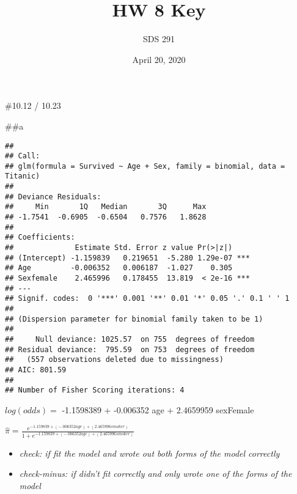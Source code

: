 \documentclass[]{article}
\title{HW 8 Key}
\author{SDS 291}
\date{April 20, 2020}
\newenvironment{Shaded}{\begin{snugshade}}{\end{snugshade}}
\newcommand{\DataTypeTok}[1]{\textcolor[rgb]{0.13,0.29,0.53}{#1}}
\newcommand{\KeywordTok}[1]{\textcolor[rgb]{0.13,0.29,0.53}{\textbf{#1}}}
\newcommand{\NormalTok}[1]{#1}
\newcommand{\OperatorTok}[1]{\textcolor[rgb]{0.81,0.36,0.00}{\textbf{#1}}}
\newcommand{\StringTok}[1]{\textcolor[rgb]{0.31,0.60,0.02}{#1}}
\providecommand{\tightlist}{%
  \setlength{\itemsep}{0pt}\setlength{\parskip}{0pt}}
\begin{document}
\maketitle

\#10.12 / 10.23

\#\#a

\begin{Shaded}
\end{Shaded}

\begin{verbatim}
## 
## Call:
## glm(formula = Survived ~ Age + Sex, family = binomial, data = Titanic)
## 
## Deviance Residuals: 
##     Min       1Q   Median       3Q      Max  
## -1.7541  -0.6905  -0.6504   0.7576   1.8628  
## 
## Coefficients:
##              Estimate Std. Error z value Pr(>|z|)    
## (Intercept) -1.159839   0.219651  -5.280 1.29e-07 ***
## Age         -0.006352   0.006187  -1.027    0.305    
## Sexfemale    2.465996   0.178455  13.819  < 2e-16 ***
## ---
## Signif. codes:  0 '***' 0.001 '**' 0.01 '*' 0.05 '.' 0.1 ' ' 1
## 
## (Dispersion parameter for binomial family taken to be 1)
## 
##     Null deviance: 1025.57  on 755  degrees of freedom
## Residual deviance:  795.59  on 753  degrees of freedom
##   (557 observations deleted due to missingness)
## AIC: 801.59
## 
## Number of Fisher Scoring iterations: 4
\end{verbatim}

\(log(odds) =\) -1.1598389 + -0.006352 age + 2.4659959 sexFemale

\(\hat\pi = \frac{e^{-1.159839+(-.006352age)+(2.465996smoker)}}{1+e^{-1.159839+(-.006352age)+(2.465996smoker)}}\)

\begin{itemize}
\tightlist
\item
  \emph{check: if fit the model and wrote out both forms of the model
  correctly}
\item
  \emph{check-minus: if didn't fit correctly and only wrote one of the
  forms of the model}
\end{itemize}
\end{document}
